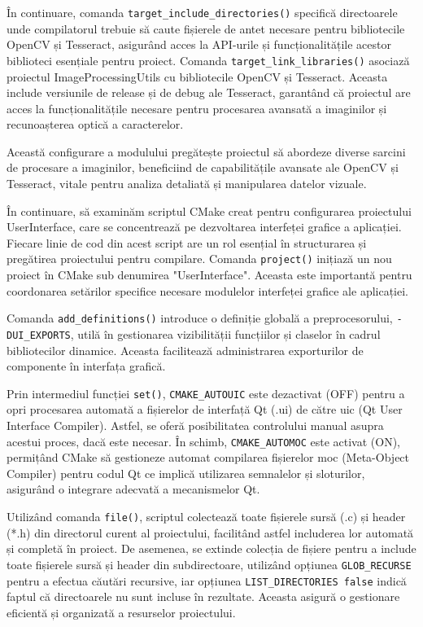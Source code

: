 \documentclass[a4paper,12pt]{report}
\begin{document}
În continuare, comanda \texttt{target\_include\_directories()} specifică directoarele unde compilatorul trebuie să caute fișierele de antet necesare pentru bibliotecile OpenCV și Tesseract, asigurând acces la API-urile și funcționalitățile acestor biblioteci esențiale pentru proiect. Comanda \texttt{target\_link\_libraries()} asociază proiectul ImageProcessingUtils cu bibliotecile OpenCV și Tesseract. Aceasta include versiunile de release și de debug ale Tesseract, garantând că proiectul are acces la funcționalitățile necesare pentru procesarea avansată a imaginilor și recunoașterea optică a caracterelor.

Această configurare a modulului pregătește proiectul să abordeze diverse sarcini de procesare a imaginilor, beneficiind de capabilitățile avansate ale OpenCV și Tesseract, vitale pentru analiza detaliată și manipularea datelor vizuale.

În continuare, să examinăm scriptul CMake creat pentru configurarea proiectului UserInterface, care se concentrează pe dezvoltarea interfeței grafice a aplicației. Fiecare linie de cod din acest script are un rol esențial în structurarea și pregătirea proiectului pentru compilare. Comanda \texttt{project()} inițiază un nou proiect în CMake sub denumirea "UserInterface". Aceasta este importantă pentru coordonarea setărilor specifice necesare modulelor interfeței grafice ale aplicației.

Comanda \texttt{add\_definitions()} introduce o definiție globală a preprocesorului, \newline \texttt{-DUI\_EXPORTS}, utilă în gestionarea vizibilității funcțiilor și claselor în cadrul bibliotecilor dinamice. Aceasta facilitează administrarea exporturilor de componente în interfața grafică.

Prin intermediul funcției \texttt{set()}, \texttt{CMAKE\_AUTOUIC} este dezactivat (OFF) pentru a opri procesarea automată a fișierelor de interfață Qt (.ui) de către uic (Qt User Interface Compiler). Astfel, se oferă posibilitatea controlului manual asupra acestui proces, dacă este necesar. În schimb, \texttt{CMAKE\_AUTOMOC} este activat (ON), permițând CMake să gestioneze automat compilarea fișierelor moc (Meta-Object Compiler) pentru codul Qt ce implică utilizarea semnalelor și sloturilor, asigurând o integrare adecvată a mecanismelor Qt.

Utilizând comanda \texttt{file()}, scriptul colectează toate fișierele sursă (.c) și header (*.h) din directorul curent al proiectului, facilitând astfel includerea lor automată și completă în proiect. De asemenea, se extinde colecția de fișiere pentru a include toate fișierele sursă și header din subdirectoare, utilizând opțiunea \texttt{GLOB\_RECURSE} pentru a efectua căutări recursive, iar opțiunea \texttt{LIST\_DIRECTORIES false} indică faptul că directoarele nu sunt incluse în rezultate. Aceasta asigură o gestionare eficientă și organizată a resurselor proiectului.
\end{document}
